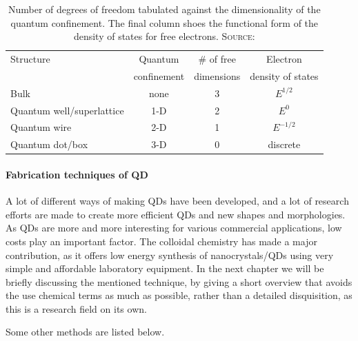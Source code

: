 		\begin{table}[htbp]
		\centering
		\caption{Number of degrees of freedom tabulated against the dimensionality of the quantum confinement.
							 The final column shoes the functional form of the density of states for free electrons.
							 {\scshape Source:} \cite[p.142]{Fox}}
			\begin{tabular}{lccc}
				Structure											&	Quantum				&	\# of free		&	Electron					\\
																			&	confinement		&	dimensions		&	density of states	\\
				\hline
				Bulk													&	none					&	3							&	$E^{1/2}$					\\
				Quantum well/superlattice			&	1-D						&	2							&	$E^{0}$						\\
				Quantum wire									&	2-D						&	1							&	$E^{-1/2}$				\\
				Quantum dot/box								&	3-D						&	0							&	discrete					\\
			\end{tabular}
			
			\label{tbl:ConfinedStr}
		\end{table}
	
	\paragraph{Fabrication techniques of \gls{QD}}
	
		A lot of different ways of making \glspl{QD} have been developed, and a lot of research efforts are made to create
		more efficient QDs and new shapes and morphologies. As \glspl{QD} are more and more interesting for various commercial applications,
		low costs play an important factor. The colloidal chemistry has made a major contribution, as it offers low energy
		synthesis of nanocrystals/QDs using very simple and affordable laboratory equipment.		
		In the next chapter we will be briefly discussing the mentioned technique, by giving a short overview
		that avoids the use chemical terms as much as possible, rather than a detailed disquisition, as this is a research field on its own.
		
		Some other methods are listed below.
	
